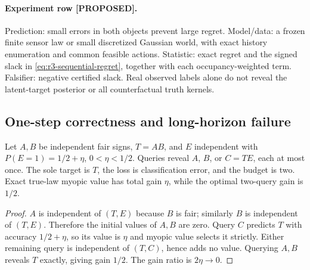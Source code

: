 \paragraph{Experiment row [PROPOSED].}
Prediction: small errors in both objects prevent large regret.
Model/data: a frozen finite sensor law or small discretized Gaussian world,
with exact history enumeration and common feasible actions.
Statistic: exact regret and the signed slack in
\eqref{eq:r3-sequential-regret}, together with each occupancy-weighted term.
Falsifier: negative certified slack.  Real observed labels alone do not
reveal the latent-target posterior or all counterfactual truth kernels.

\subsection{One-step correctness and long-horizon failure}

\begin{counterexample}
Let $A,B$ be independent fair signs, $T=AB$, and $E$ independent with
$P(E=1)=1/2+\eta$, $0<\eta<1/2$.  Queries reveal $A$, $B$, or $C=TE$,
each at most once.  The sole target is $T$, the loss is classification
error, and the budget is two.  Exact true-law myopic value has total gain
$\eta$, while the optimal two-query gain is $1/2$.
\end{counterexample}
\begin{proof}
$A$ is independent of $(T,E)$ because $B$ is fair; similarly $B$ is
independent of $(T,E)$.  Therefore the initial values of $A,B$ are zero.
Query $C$ predicts $T$ with accuracy $1/2+\eta$, so its value is $\eta$
and myopic value selects it strictly.  Either remaining query is
independent of $(T,C)$, hence adds no value.  Querying $A,B$ reveals $T$
exactly, giving gain $1/2$.  The gain ratio is $2\eta\to0$.
\end{proof}

